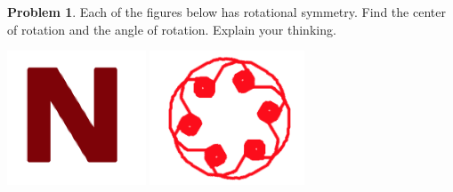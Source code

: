 \documentclass[12pt, reqno]{amsart}
\theoremstyle{remark}
\theoremstyle{definition}
\newtheorem{problem}{Problem}
\numberwithin{equation}{section}  %
\begin{document}
\begin{problem}
Each of the figures below has rotational symmetry.  Find the center of rotation and the angle of rotation.  Explain your thinking.

\begin{center}
\includegraphics[height=4cm]{rotsym1}
\qquad\qquad
\includegraphics[height=4cm]{rotsym2}
\end{center}

\end{problem}

\bigskip
\end{document}
